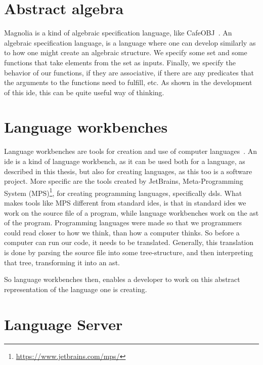 \section{Abstract algebra}

Magnolia is a kind of algebraic specification language, like CafeOBJ~\cite{cafeObj}.
An algebraic specification language, is a language where one can develop
similarly as to how one might create an algebraic structure. We specify some set
and some functions that take elements from the set as inputs. Finally, we
specify the behavior of our functions, if they are associative, if there are any
predicates that the arguments to the functions need to fulfill, etc. As shown in
the development of this \gls*{ide}, this can be quite useful way of thinking.


\section{Language workbenches}

Language workbenches are tools for creation and use of computer languages~\cite{lwb}.
An \gls*{ide} is a kind of language workbench, as it can be used both for a
language, as described in this thesis, but also for creating languages, as this
too is a software project. More specific are the tools created by JetBrains,
Meta-Programming System (MPS)\footnote{\url{https://www.jetbrains.com/mps/}},
for creating programming languages, specifically \gls*{dsl}s. What makes tools
like MPS different from standard \gls*{ide}s, is that in standard \gls*{ide}s we
work on the source file of a program, while language workbenches work on the
\gls*{ast} of the program. Programming languages were made so that we
programmers could read closer to how we think, than how a computer thinks. So
before a computer can run our code, it needs to be translated. Generally, this
translation is done by parsing the source file into some tree-structure, and
then interpreting that tree, transforming it into an \gls*{ast}.

So language workbenches then, enables a developer to work on this abstract
representation of the language one is creating.


\section{Language Server}

